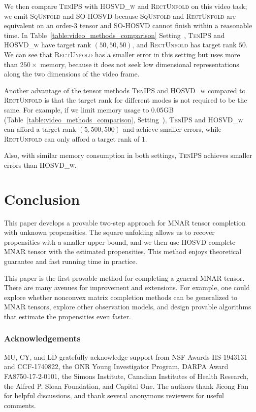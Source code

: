 \documentclass{article}
\newcommand{\RomanNumeralCaps}[1]{\MakeUppercase{\romannumeral #1}} %
\theoremstyle{plain}
\begin{document}
We then compare \textsc{TenIPS} with \textsc{HOSVD\_w} and \textsc{RectUnfold} on this video task;
we omit \textsc{SqUnfold} and \textsc{SO-HOSVD}
because \textsc{SqUnfold} and \textsc{RectUnfold} are equivalent on an order-3 tensor
and \textsc{SO-HOSVD} cannot finish within a reasonable time. 
In Table~\ref{table:video_methods_comparison} Setting~\RomanNumeralCaps{1}, \textsc{TenIPS} and \textsc{HOSVD\_w} have target rank $(50, 50, 50)$, and \textsc{RectUnfold} has target rank $50$.
We can see that \textsc{RectUnfold} has a smaller error in this setting but uses more than $250\times$ memory, because it does not seek low dimensional representations along the two dimensions of the video frame. 

Another advantage of the tensor methods \textsc{TenIPS} and \textsc{HOSVD\_w}
compared to \textsc{RectUnfold}
is that the target rank for different modes is not required to be the same.
For example, if we limit memory usage to 0.05GB (Table~\ref{table:video_methods_comparison}, Setting~\RomanNumeralCaps{2}),
\textsc{TenIPS} and \textsc{HOSVD\_w} can afford a target rank $(5, 500, 500)$
and achieve smaller errors, 
while \textsc{RectUnfold} can only afford a target rank of $1$.

Also, with similar memory consumption in both settings, \textsc{TenIPS} achieves smaller errors than \textsc{HOSVD\_w}. 

\section{Conclusion}
This paper develops a provable two-step approach for MNAR tensor completion with unknown propensities.
The square unfolding allows us to recover propensities with a smaller upper bound, and we then use HOSVD complete MNAR tensor with the estimated propensities. 
This method enjoys theoretical guarantee and fast running time in practice. 

This paper is the first provable method for completing a general MNAR tensor.
There are many avenues for improvement and extensions.
For example, one could explore whether nonconvex matrix completion methods can be generalized to MNAR tensors, explore other observation models, and design provable algorithms that estimate the propensities even faster. 

\subsubsection*{Acknowledgements}
MU, CY, and LD gratefully acknowledge support from
NSF Awards IIS-1943131 and CCF-1740822, 
the ONR Young Investigator Program, 
DARPA Award FA8750-17-2-0101,
the Simons Institute,
Canadian Institutes of Health Research, 
the Alfred P. Sloan Foundation,
and Capital One.
The authors thank Jicong Fan for helpful discussions, and thank several anonymous reviewers for useful comments.
\end{document}
